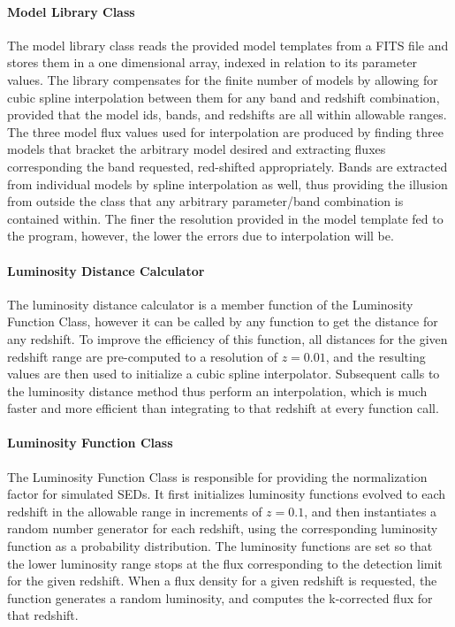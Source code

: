\documentclass[twocolumn,letterpaper,10pt]{article}
\begin{document}
\paragraph{Model Library Class}\label{class:models}
The model library class reads the provided model templates from a FITS file and stores them in a one dimensional array, indexed in relation to its parameter values. The library compensates for the finite number of models by allowing for cubic spline interpolation between them for any band and redshift combination, provided that the model ids, bands, and redshifts are all within allowable ranges. The three model flux values used for interpolation are produced by finding three models that bracket the arbitrary model desired and extracting fluxes corresponding the band requested, red-shifted appropriately. Bands are extracted from individual models by spline interpolation as well, thus providing the illusion from outside the class that any arbitrary parameter/band combination is contained within. The finer the resolution provided in the model template fed to the program, however, the lower the errors due to interpolation will be. 

\paragraph{Luminosity Distance Calculator}
The luminosity distance calculator is a member function of the Luminosity Function Class, however it can be called by any function to get the distance for any redshift. To improve the efficiency of this function, all distances for the given redshift range are pre-computed to a resolution of $z=0.01$, and the resulting values are then used to initialize a cubic spline interpolator. Subsequent calls to the luminosity distance method thus perform an interpolation, which is much faster and more efficient than integrating to that redshift at every function call.

\paragraph{Luminosity Function Class}
The Luminosity Function Class is responsible for providing the normalization factor for simulated SEDs. It first initializes luminosity functions evolved to each redshift in the allowable range in increments of $z=0.1$, and then instantiates a random number generator for each redshift, using the corresponding luminosity function as a probability distribution. The luminosity functions are set so that the lower luminosity range stops at the flux corresponding to the detection limit for the given redshift. When a flux density for a given redshift is requested, the function generates a random luminosity, and computes the k-corrected flux for that redshift.
\end{document}
